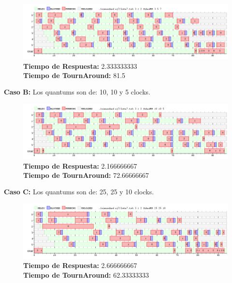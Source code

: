 \documentclass[a4paper]{article}
\begin{document}
		 \begin{figure}[h!]
   \begin{center}
 	\includegraphics[scale=0.5]{imagenes/ej7/3nucleoA.png}
 	\textbf{Tiempo de Respuesta:} 2.333333333 \\
 	\textbf{Tiempo de TournAround:} 81.5 \\
   \end{center}
 \end{figure} 
 	
	\textbf{Caso B:}  Los quantums son de: 10, 10 y 5 clocks.

		 \begin{figure}[h!]
   \begin{center}
 	\includegraphics[scale=0.5]{imagenes/ej7/3nucleoB.png}
 	\textbf{Tiempo de Respuesta:} 2.166666667 \\
 	\textbf{Tiempo de TournAround:} 72.66666667 \\
   \end{center}
 \end{figure} 
 	
	\textbf{Caso C:}  Los quantums son de: 25, 25 y 10 clocks.

		 \begin{figure}[h!]
   \begin{center}
 	\includegraphics[scale=0.5]{imagenes/ej7/3nucleoC.png}
 	\textbf{Tiempo de Respuesta:} 2.666666667 \\
 	\textbf{Tiempo de TournAround:} 62.33333333 \\
   \end{center}
 \end{figure} 
 
\end{document}
